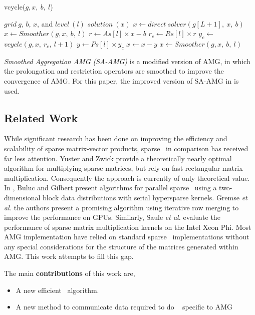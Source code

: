 \begin{algorithm}[ht] 
  \caption{vcycle($g, x,\ b,\ l$)} \label{alg:vcycle} 
  \begin{algorithmic}[1]
    \Require $grid\ g$, $b$, $x$, and $level\ (l)$
    \Ensure  $solution\ (x)$
      \State $x \leftarrow direct\ solver(g[L+1],\ x,\ b)$
    \Else
      \State $x \leftarrow Smoother(g, x,\ b,\ l)$
      \State $r \leftarrow As[l] \times x - b$
      \State $r_c \leftarrow Rs[l] \times r$
      \State $y_c \leftarrow$ $vcycle(g, x,\ r_c,\ l+1)$
      \State $y \leftarrow Ps[l] \times y_c$
      \State $x \leftarrow x - y$
      \State $x \leftarrow Smoother(g, x,\ b,\ l)$
    \EndIf
  \end{algorithmic}
\end{algorithm}

\textit{Smoothed Aggregation AMG (SA-AMG)}\cite{Vanek:1995} is a modified version of AMG,
in which the prolongation and restriction operators are smoothed %
to improve the convergence of AMG.
For this paper, the improved version of SA-AMG in \cite{treister2015non} is used.


\subsection{Related Work}

While significant research has been done on improving the efficiency and scalability of sparse matrix-vector products, sparse \mm\ in comparison has received far less attention. Yuster and Zwick \cite{Yuster2005} provide a theoretically nearly optimal algorithm for multiplying sparse matrices, but rely on fast rectangular matrix multiplication. Consequently the approach is currently of only theoretical value. In \cite{Buluc12}, Buluc and Gilbert present algorithms for parallel sparse \mm\ using a two-dimensional block data distributions with serial hypersparse kernels. 
Gremse {\em et al.} \cite{Gremse15} the authors present a promising algorithm using iterative row merging to improve the performance on GPUs. Similarly, Saule {\em et al.} \cite{Saule14} evaluate the performance of sparse matrix multiplication kernels on the Intel Xeon Phi. Most AMG implementation have relied on standard sparse \mm\ implementations without any special considerations for the structure of the matrices generated within AMG. This work attempts to fill this gap. 

The main {\bf contributions} of this work are,
\begin{itemize}
  \item A new efficient \mm\ algorithm.
  \item A new method to communicate data required to do \mm~ specific to AMG
\end{itemize}

